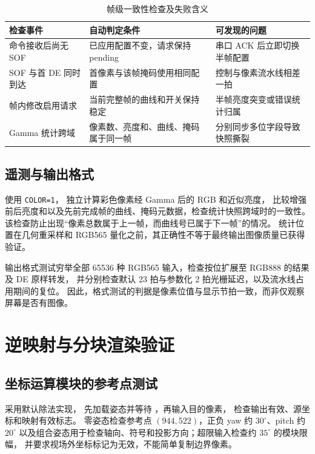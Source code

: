 \begin{table}[htbp]\centering\small
\caption{帧级一致性检查及失败含义}\label{tab:sim-frame-atomic}
\begin{tabularx}{\textwidth}{>{\raggedright\arraybackslash}p{3.2cm}YY}
\toprule
检查事件 & 自动判定条件 & 可发现的问题 \\
\midrule
命令接收后尚无 SOF & 已应用配置不变，请求保持 pending & 串口 ACK 后立即切换半帧配置 \\
SOF 与首 DE 同时到达 & 首像素与该帧掩码使用相同配置 & 控制与像素流水线相差一拍 \\
帧内修改启用请求 & 当前完整帧的曲线和开关保持稳定 & 半帧亮度突变或错误统计归属 \\
Gamma 统计跨域 & 像素数、亮度和、曲线、掩码属于同一帧 & 分别同步多位字段导致快照撕裂 \\
\bottomrule
\end{tabularx}
\end{table}

\subsection{遥测与输出格式}
 使用 \texttt{COLOR=1}，
独立计算彩色像素经 Gamma 后的 RGB 和近似亮度，
比较增强前后亮度和以及先前完成帧的曲线、掩码元数据，检查统计快照跨域时的一致性。
该检查防止出现“像素总数属于上一帧，而曲线号已属于下一帧”的情况。
统计位置在几何重采样和 RGB565 量化之前，其正确性不等于最终输出图像质量已获得验证。

输出格式测试穷举全部 65536 种 RGB565 输入，检查按位扩展至 RGB888 的结果及 DE 原样转发，
并分别检查默认 23 拍与参数化 2 拍光栅延迟，以及流水线占用期间的复位。
因此，格式测试的判据是像素位值与显示节拍一致，而非仅观察屏幕是否有图像。

\section{逆映射与分块渲染验证}
\subsection{坐标运算模块的参考点测试}
 采用默认除法实现，
先加载姿态并等待 ，再输入目的像素，
检查输出有效、源坐标和映射有效标志。
零姿态检查参考点 $(944,522)$，正负 yaw 约 $30^\circ$、pitch 约 $20^\circ$
以及组合姿态用于检查轴向、符号和投影方向；超限输入检查约 $35^\circ$ 的模块限幅，
并要求视场外坐标标记为无效，不能简单复制边界像素。

